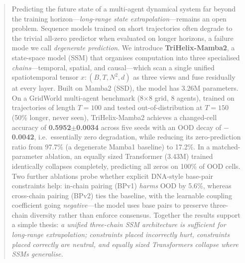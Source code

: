 \begin{abstract}
Predicting the future state of a multi-agent dynamical system far beyond the
training horizon---\emph{long-range state extrapolation}---remains an open
problem. Sequence models trained on short trajectories often degrade to the
trivial all-zero predictor when evaluated on longer horizons, a failure mode we
call \emph{degenerate prediction}. We introduce \textbf{TriHelix-Mamba2}, a
state-space model (SSM) that organises computation into three specialised
\emph{chains}---temporal, spatial, and causal---which scan a single unified
spatiotemporal tensor $x{:}(B,T,N^{2},d)$ as three views and fuse residually at
every layer. Built on Mamba2 (SSD), the model has 3.26M parameters. On a
GridWorld multi-agent benchmark (8$\times$8 grid, 8 agents), trained on
trajectories of length $T{=}100$ and tested out-of-distribution at $T{=}150$
(50\% longer, never seen), TriHelix-Mamba2 achieves a changed-cell accuracy of
\textbf{0.5952$\pm$0.0034} across five seeds with an OOD decay of
\textbf{$-$0.0042}, i.e.\ essentially zero degradation, while reducing its
zero-prediction ratio from 97.7\% (a degenerate Mamba1 baseline) to 17.2\%. In
a matched-parameter ablation, an equally sized Transformer (3.43M) trained
identically collapses completely, predicting all zeros on 100\% of OOD cells.
Two further ablations probe whether explicit DNA-style base-pair constraints
help: in-chain pairing (BPv1) \emph{harms} OOD by 5.6\%, whereas cross-chain
pairing (BPv2) ties the baseline, with the learnable coupling coefficient going
\emph{negative}---the model uses base pairs to preserve three-chain diversity
rather than enforce consensus. Together the results support a simple thesis:
\emph{a unified three-chain SSM architecture is sufficient for long-range
extrapolation; constraints placed incorrectly hurt, constraints placed
correctly are neutral, and equally sized Transformers collapse where SSMs
generalise.}
\end{abstract}
